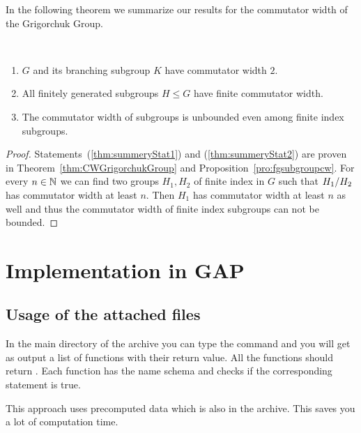 \documentclass[a4paper,11pt]{amsart}
\begin{document}
In the following theorem we summarize our results for the commutator width of the Grigorchuk Group.
\begin{thm}\ 
 \begin{enumerate}
  \item $G$ and its branching subgroup $K$ have commutator width $2$. \label{thm:summeryStat1}
  \item All finitely generated subgroups $H\leq G$ have finite commutator width.\label{thm:summeryStat2}
  \item \label{thm:summeryStat3} The commutator width of subgroups is unbounded even among finite index subgroups.
 \end{enumerate}
\end{thm}
\begin{proof}
 Statements~(\ref{thm:summeryStat1}) and (\ref{thm:summeryStat2}) are proven in Theorem~\ref{thm:CWGrigorchukGroup} and Proposition~\ref{pro:fgsubgroupcw}.
 For every $n\in\mathbb{N}$ we can find two groups $H_1,H_2$ of finite index in $G$ such that ${H_1/H_2}$ has commutator
 width at least $n$. Then $H_1$ has commutator width at least $n$ as well and thus the commutator width of finite index subgroups can not be bounded.
\end{proof}
\section{Implementation in GAP}
\subsection{Usage of the attached files}
In the main directory of the archive you can type the command  and 
you will get as output a list of functions with their return value. All the functions should
return \gapinline{true}. Each function has the name schema \gapinline{verifi*} and checks
if the corresponding statement is true.

This approach uses precomputed data which is also in the archive. This saves you a lot of
computation time.
\end{document}
